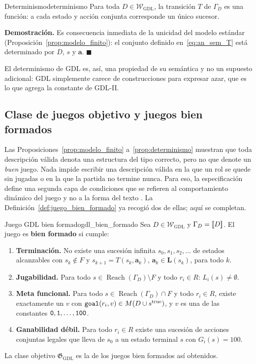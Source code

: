 \begin{proposicion}{Determinismo}{determinismo}
Para toda $D \in \mathcal W_{\mathrm{GDL}}$, la transición $T$ de $\Gamma_D$ es una función: a cada estado y acción conjunta corresponde un único sucesor.
\end{proposicion}

\noindent\textbf{Demostración.} Es consecuencia inmediata de la unicidad del modelo estándar (Proposición~\ref{prop:modelo_finito}): el conjunto definido en~\eqref{eq:an_sem_T} está determinado por $D$, $s$ y $\mathbf a$. \hfill $\blacksquare$

El determinismo de GDL es, así, una propiedad de su semántica y no un supuesto adicional: GDL simplemente carece de construcciones para expresar azar, que es lo que agrega la constante  de GDL-II.

\subsection{Clase de juegos objetivo y juegos bien formados}

Las Proposiciones~\ref{prop:modelo_finito} a~\ref{prop:determinismo} muestran que toda descripción válida denota una estructura del tipo correcto, pero no que denote un \emph{buen} juego. Nada impide escribir una descripción válida en la que un rol se quede sin jugadas o en la que la partida no termine nunca. Para eso, la especificación define una segunda capa de condiciones que se refieren al comportamiento dinámico del juego y no a la forma del texto \cite{Love2008GDL, GeneserethThielscher2014}. La Definición~\ref{def:juego_bien_formado} ya recogió dos de ellas; aquí se completan.

\begin{definicion}{Juego GDL bien formado}{gdl_bien_formado}
Sea $D \in \mathcal W_{\mathrm{GDL}}$ y $\Gamma_D = [\![D]\!]$. El juego es \textbf{bien formado} si cumple:
\begin{enumerate}
    \item \textbf{Terminación.} No existe una sucesión infinita $s_0, s_1, s_2, \dots$ de estados alcanzables con $s_k \notin F$ y $s_{k+1} = T(s_k, \mathbf a_k)$, $\mathbf a_k \in \mathbf L(s_k)$, para todo $k$.
    \item \textbf{Jugabilidad.} Para todo $s \in \operatorname{Reach}(\Gamma_D) \setminus F$ y todo $r_i \in R$: $L_i(s) \neq \emptyset$.
    \item \textbf{Meta funcional.} Para todo $s \in \operatorname{Reach}(\Gamma_D) \cap F$ y todo $r_i \in R$, existe exactamente un $v$ con $\texttt{goal}(r_i, v) \in M(D \cup s^{\mathrm{true}})$, y $v$ es una de las constantes $\texttt{0}, \texttt{1}, \dots, \texttt{100}$.
    \item \textbf{Ganabilidad débil.} Para todo $r_i \in R$ existe una sucesión de acciones conjuntas legales que lleva de $s_0$ a un estado terminal $s$ con $G_i(s) = 100$.
\end{enumerate}
La clase objetivo $\mathfrak G_{\mathrm{GDL}}$ es la de los juegos bien formados así obtenidos.
\end{definicion}

